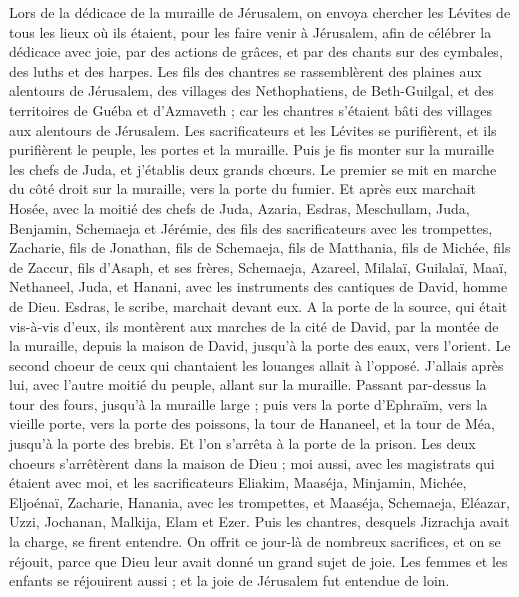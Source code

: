 \begin{multicols}{2}
Lors de la dédicace de la muraille de Jérusalem, on envoya chercher les Lévites de tous les lieux où ils étaient, pour les faire venir à Jérusalem, afin de célébrer la dédicace avec joie, par des actions de grâces, et par des chants sur des cymbales, des luths et des harpes.
Les fils des chantres se rassemblèrent des plaines aux alentours de Jérusalem, des villages des Nethophatiens,
de Beth-Guilgal, et des territoires de Guéba et d'Azmaveth ; car les chantres s'étaient bâti des villages aux alentours de Jérusalem.
Les sacrificateurs et les Lévites se purifièrent, et ils purifièrent le peuple, les portes et la muraille.
Puis je fis monter sur la muraille les chefs de Juda, et j'établis deux grands chœurs. Le premier se mit en marche du côté droit sur la muraille, vers la porte du fumier.
Et après eux marchait Hosée, avec la moitié des chefs de Juda,
Azaria, Esdras, Meschullam,
Juda, Benjamin, Schemaeja et Jérémie,
des fils des sacrificateurs avec les trompettes, Zacharie, fils de Jonathan, fils de Schemaeja, fils de Matthania, fils de Michée, fils de Zaccur, fils d'Asaph,
et ses frères, Schemaeja, Azareel, Milalaï, Guilalaï, Maaï, Nethaneel, Juda, et Hanani, avec les instruments des cantiques de David, homme de Dieu. Esdras, le scribe, marchait devant eux.
A la porte de la source, qui était vis-à-vis d'eux, ils montèrent aux marches de la cité de David, par la montée de la muraille, depuis la maison de David, jusqu'à la porte des eaux, vers l'orient.
Le second choeur de ceux qui chantaient les louanges allait à l'opposé. J'allais après lui, avec l'autre moitié du peuple, allant sur la muraille. Passant par-dessus la tour des fours, jusqu'à la muraille large ;
puis vers la porte d'Ephraïm, vers la vieille porte, vers la porte des poissons, la tour de Hananeel, et la tour de Méa, jusqu'à la porte des brebis. Et l'on s'arrêta à la porte de la prison.
Les deux choeurs s'arrêtèrent dans la maison de Dieu ; moi aussi, avec les magistrats qui étaient avec moi,
et les sacrificateurs Eliakim, Maaséja, Minjamin, Michée, Eljoénaï, Zacharie, Hanania, avec les trompettes,
et Maaséja, Schemaeja, Eléazar, Uzzi, Jochanan, Malkija, Elam et Ezer. Puis les chantres, desquels Jizrachja avait la charge, se firent entendre.
On offrit ce jour-là de nombreux sacrifices, et on se réjouit, parce que Dieu leur avait donné un grand sujet de joie. Les femmes et les enfants se réjouirent aussi ; et la joie de Jérusalem fut entendue de loin.

\end{multicols}
